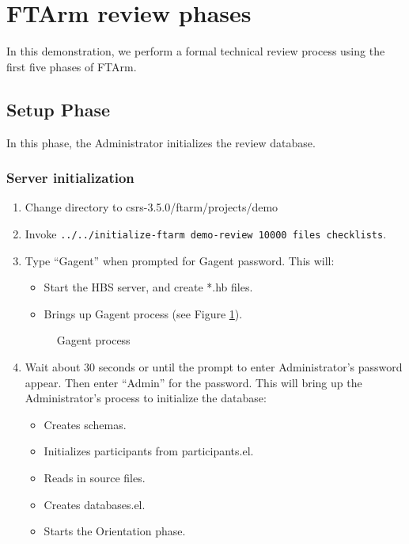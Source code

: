 \newpage
\section {FTArm review phases}
In this demonstration, we perform a formal technical review process
using the first five phases of FTArm.

\subsection{Setup Phase}
In this phase, the Administrator initializes the review database.

\subsubsection{Server initialization}

\begin{enumerate}
\item Change directory to csrs-3.5.0/ftarm/projects/demo
\item Invoke {\tt ../../initialize-ftarm demo-review 10000 files checklists}.
\item Type ``Gagent'' when prompted for Gagent password. This will: 
  \begin{itemize}
  \item Start the HBS server, and create *.hb files.
  \item Brings up Gagent process (see Figure \ref{Gagent}). 
  \end{itemize}
\begin{figure}[htb]
  {\centerline{}}
  \caption{Gagent process}
  \label{Gagent}
\end{figure}

\item Wait about 30 seconds or until the prompt to enter
Administrator's password appear. 
 Then enter ``Admin'' for the password. This will
 bring up the Administrator's process to initialize the database:
  \begin{itemize}
  \item Creates schemas.
  \item Initializes participants from participants.el.
  \item Reads in source files.
  \item Creates databases.el.
  \item Starts the Orientation phase.
  \end{itemize}
\end{enumerate}

